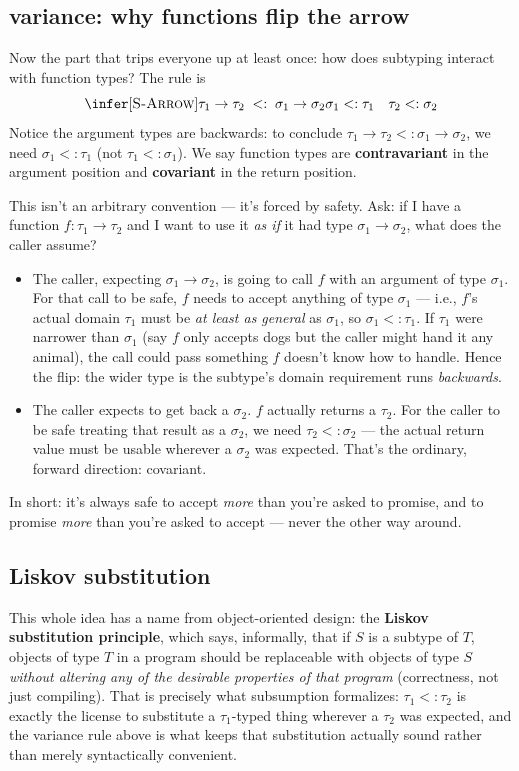 \subsection{variance: why functions flip the arrow}

Now the part that trips everyone up at least once: how does subtyping interact with function types? The rule is
\[
\infer[\textsc{S-Arrow}]
  {\tau_1 \to \tau_2 \;<:\; \sigma_1 \to \sigma_2}
  {\sigma_1 <: \tau_1 \quad \tau_2 <: \sigma_2}
\]
Notice the argument types are backwards: to conclude $\tau_1\to\tau_2 <: \sigma_1\to\sigma_2$, we need $\sigma_1 <: \tau_1$ (not $\tau_1<:\sigma_1$). We say function types are \textbf{contravariant} in the argument position and \textbf{covariant} in the return position.

This isn't an arbitrary convention — it's forced by safety. Ask: if I have a function $f : \tau_1\to\tau_2$ and I want to use it \emph{as if} it had type $\sigma_1\to\sigma_2$, what does the caller assume?

\begin{itemize}
  \item The caller, expecting $\sigma_1\to\sigma_2$, is going to call $f$ with an argument of type $\sigma_1$. For that call to be safe, $f$ needs to accept anything of type $\sigma_1$ — i.e., $f$'s actual domain $\tau_1$ must be \emph{at least as general} as $\sigma_1$, so $\sigma_1<:\tau_1$. If $\tau_1$ were narrower than $\sigma_1$ (say $f$ only accepts dogs but the caller might hand it any animal), the call could pass something $f$ doesn't know how to handle. Hence the flip: the wider type is the subtype's domain requirement runs \emph{backwards}.
  \item The caller expects to get back a $\sigma_2$. $f$ actually returns a $\tau_2$. For the caller to be safe treating that result as a $\sigma_2$, we need $\tau_2 <: \sigma_2$ — the actual return value must be usable wherever a $\sigma_2$ was expected. That's the ordinary, forward direction: covariant.
\end{itemize}
In short: it's always safe to accept \emph{more} than you're asked to promise, and to promise \emph{more} than you're asked to accept — never the other way around.

\subsection{Liskov substitution}

This whole idea has a name from object-oriented design: the \textbf{Liskov substitution principle}, which says, informally, that if $S$ is a subtype of $T$, objects of type $T$ in a program should be replaceable with objects of type $S$ \emph{without altering any of the desirable properties of that program} (correctness, not just compiling). That is precisely what subsumption formalizes: $\tau_1<:\tau_2$ is exactly the license to substitute a $\tau_1$-typed thing wherever a $\tau_2$ was expected, and the variance rule above is what keeps that substitution actually sound rather than merely syntactically convenient.

